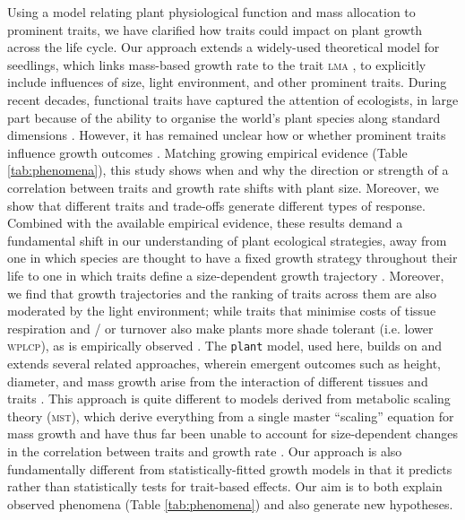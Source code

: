 \documentclass[9pt,twocolumn,twoside,lineno]{pnas-new}
\newcommand{\plant}{\texttt{plant}}
\newcommand{\lma}{\textsc{lma}}
\begin{document}
Using a model relating plant physiological function and mass allocation to prominent traits, we have clarified how traits could impact on plant growth across the life cycle. Our approach extends a widely-used theoretical model for seedlings, which links mass-based growth rate to the trait {\lma} \citep{Lambers-1992, Wright-2000}, to explicitly include influences of size, light environment, and other prominent traits. During recent decades, functional traits have captured the attention of ecologists, in large part because of the ability to organise the world's plant species along standard dimensions \citep{Westoby-2002}. However, it has remained unclear how or whether prominent traits influence growth outcomes \citep{Poorter-2008, Wright-2010,Paine-2015}. Matching growing empirical evidence (Table \ref{tab:phenomena}), this study shows when and why the direction or strength of a correlation between traits and growth rate shifts with plant size. Moreover, we show that different traits and trade-offs generate different types of response. Combined with the available empirical evidence, these results demand a fundamental shift in our understanding of plant ecological strategies, away from one in which species are thought to have a fixed growth strategy throughout their life \citep[e.g.][]{Grime-1977, Adler-2014, Paine-2015} to one in which traits define a size-dependent growth trajectory \citep{Gibert-2016}. Moreover, we find that growth trajectories and the ranking of traits across them are also moderated by the light environment; while traits that minimise costs of tissue respiration and / or turnover also make plants more shade tolerant (i.e. lower \textsc{wplcp}), as is empirically observed \citep{Messier-1999, Craine-2005, Poorter-2006, Baltzer-2007, Lusk-2008}. The {\plant} model, used here, builds on and extends several related approaches, wherein emergent outcomes such as height, diameter, and mass growth arise from the interaction of different tissues and traits \citep[e.g.][]{Givnish-1988, Makela-1997, Moorcroft-2001}. This approach is quite different to models derived from metabolic scaling theory (\textsc{mst}), which derive everything from a single master ``scaling'' equation for mass growth and have thus far been unable to account for size-dependent changes in the correlation between traits and growth rate \citep{Enquist-1999, Enquist-2007}. Our approach is also fundamentally different from statistically-fitted growth models \citep[e.g.][]{Herault-2011, Ruger-2012, Iida-2014} in that it predicts rather than statistically tests for trait-based effects. Our aim is to both explain observed phenomena (Table \ref{tab:phenomena}) and also generate new hypotheses.
\end{document}
